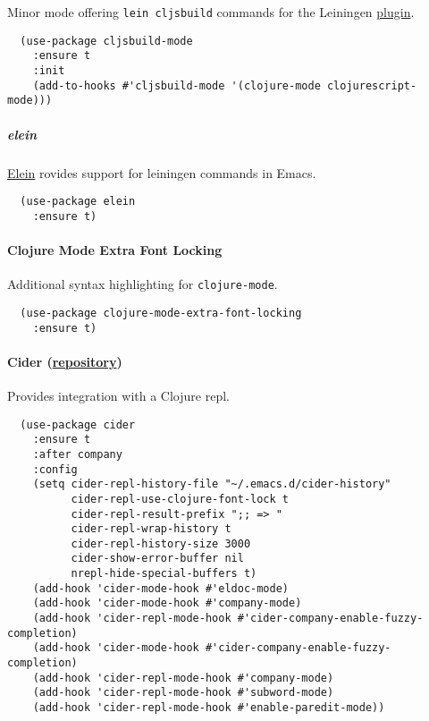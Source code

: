 \documentclass[11pt]{article}
\begin{document}
Minor mode offering \texttt{lein cljsbuild} commands for the Leiningen \href{https://github.com/emezeske/lein-cljsbuild}{plugin}.

\begin{verbatim}
  (use-package cljsbuild-mode
    :ensure t
    :init
    (add-to-hooks #'cljsbuild-mode '(clojure-mode clojurescript-mode)))
\end{verbatim}

\subparagraph*{elein}
\label{sec:orgb761253}

\href{https://github.com/remvee/elein}{Elein} rovides support for leiningen commands in Emacs.

\begin{verbatim}
  (use-package elein
    :ensure t)
\end{verbatim}

\paragraph*{Clojure Mode Extra Font Locking}
\label{sec:org7adf88e}

Additional syntax highlighting for \texttt{clojure-mode}.


\begin{verbatim}
  (use-package clojure-mode-extra-font-locking
    :ensure t)
\end{verbatim}

\paragraph*{Cider (\href{https://github.com/clojure-emacs/cider}{repository})}
\label{sec:orgdb6caa7}

Provides integration with a Clojure repl.

\begin{verbatim}
  (use-package cider
    :ensure t
    :after company
    :config
    (setq cider-repl-history-file "~/.emacs.d/cider-history"
          cider-repl-use-clojure-font-lock t
          cider-repl-result-prefix ";; => "
          cider-repl-wrap-history t
          cider-repl-history-size 3000
          cider-show-error-buffer nil
          nrepl-hide-special-buffers t)
    (add-hook 'cider-mode-hook #'eldoc-mode)
    (add-hook 'cider-mode-hook #'company-mode)
    (add-hook 'cider-repl-mode-hook #'cider-company-enable-fuzzy-completion)
    (add-hook 'cider-mode-hook #'cider-company-enable-fuzzy-completion)
    (add-hook 'cider-repl-mode-hook #'company-mode)
    (add-hook 'cider-repl-mode-hook #'subword-mode)
    (add-hook 'cider-repl-mode-hook #'enable-paredit-mode))
\end{verbatim}
\end{document}
